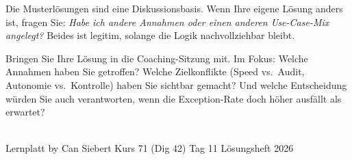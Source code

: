 \documentclass[11pt,a4paper,oneside]{article}
\begin{document}
\noindent Die Musterl\"osungen sind eine Diskussionsbasis. Wenn Ihre eigene L\"osung anders ist, fragen Sie: \emph{Habe ich andere Annahmen oder einen anderen Use-Case-Mix angelegt?} Beides ist legitim, solange die Logik nachvollziehbar bleibt.

\medskip
\begin{infobox}
Bringen Sie Ihre L\"osung in die Coaching-Sitzung mit. Im Fokus: Welche Annahmen haben Sie getroffen? Welche Zielkonflikte (Speed vs.\ Audit, Autonomie vs.\ Kontrolle) haben Sie sichtbar gemacht? Und welche Entscheidung w\"urden Sie auch verantworten, wenn die Exception-Rate doch h\"oher ausf\"allt als erwartet?
\end{infobox}

\vspace{1cm}
\noindent{\color{lpAccent}\rule{\linewidth}{0.6pt}}\\[4pt]
{\footnotesize\sffamily\color{lpGray}Lernplatt \textperiodcentered{} by Can Siebert \textperiodcentered{} Kurs 71 (Dig 42) \textperiodcentered{} Tag 11 \textperiodcentered{} L\"osungsheft \textperiodcentered{} \textcopyright{} 2026}
\end{document}
